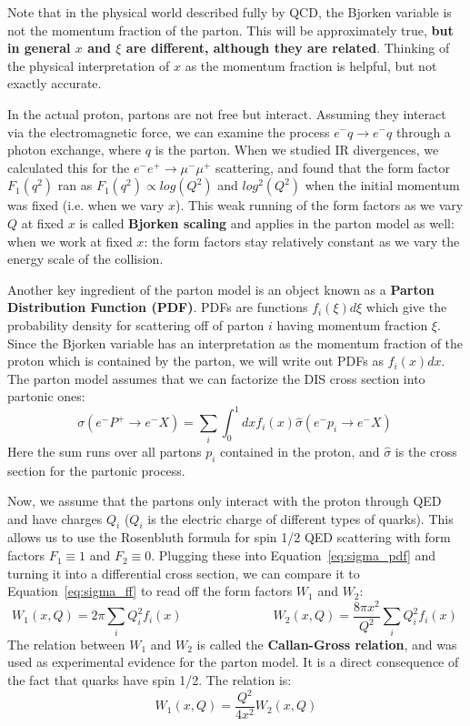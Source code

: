 \documentclass[11pt, oneside]{article}   	%
\theoremstyle{definition}
\begin{document}
Note that in the physical world described fully by QCD, the Bjorken variable is not the momentum fraction of the 
parton. This will be approximately true, \textbf{but in general $x$ and $\xi$ are different, although they are related}. Thinking of the physical 
interpretation of $x$ as the momentum fraction is helpful, but not exactly accurate. 

In the actual proton, partons are not free but interact. Assuming they interact via the electromagnetic force, we can 
examine the process $e^-q\rightarrow e^-q$ through a photon exchange, where $q$ is the parton. When we studied IR divergences, 
we calculated this for the $e^-e^+\rightarrow\mu^-\mu^+$ scattering, and found that the form factor $F_1(q^2)$ ran as $F_1(q^2)\propto 
log(Q^2)$ and $log^2(Q^2)$ when the initial momentum was fixed (i.e. when we vary $x$). This weak running of the form factors 
as we vary $Q$ at fixed $x$ is called \textbf{Bjorken scaling} and applies in the parton model as well: when we work at fixed $x$: 
the form factors stay relatively constant as we vary the energy scale of the collision. 

Another key ingredient of the parton model is an object known as a \textbf{Parton Distribution Function (PDF)}. PDFs are functions 
$f_i(\xi)d\xi$ which give the probability density for scattering off of parton $i$ having momentum fraction $\xi$. Since the Bjorken 
variable has an interpretation as the momentum fraction of the proton which is contained by the parton, we will write out PDFs as 
$f_i(x)dx$. The parton model assumes that we can factorize the DIS cross section into partonic ones:
\begin{equation}
	\sigma(e^- P^+\rightarrow e^- X) = \sum_i\int_0^1dx f_i(x)\hat{\sigma}(e^- p_i\rightarrow e^- X)~
	\label{eq:sigma_pdf}
\end{equation}
Here the sum runs over all partons $p_i$ contained in the proton, and $\hat\sigma$ is the cross section for the partonic process. 

Now, we assume that the partons only interact with the proton through QED and have charges $Q_i$ ($Q_i$ is the electric charge of 
different types of quarks). This allows us to use the Rosenbluth formula for spin 1/2 QED scattering with form factors $F_1\equiv 1$ and 
$F_2\equiv 0$. Plugging these into Equation~\ref{eq:sigma_pdf} and turning it into a differential cross section, we can compare it to 
Equation~\ref{eq:sigma_ff} to read off the form factors $W_1$ and $W_2$:
\begin{equation}
	W_1(x, Q) = 2\pi\sum_i Q_i^2 f_i(x) \hspace{3cm}W_2(x, Q) = \frac{8\pi x^2}{Q^2}\sum_i Q_i^2 f_i(x)~
	\label{eq:ff_decomp}
\end{equation}
The relation between $W_1$ and $W_2$ is called the \textbf{Callan-Gross relation}, and was used as experimental evidence for the 
parton model. It is a direct consequence of the fact that quarks have spin 1/2. The relation is:
\begin{equation}
	W_1(x, Q) = \frac{Q^2}{4x^2} W_2(x, Q)
\end{equation}
\end{document}
